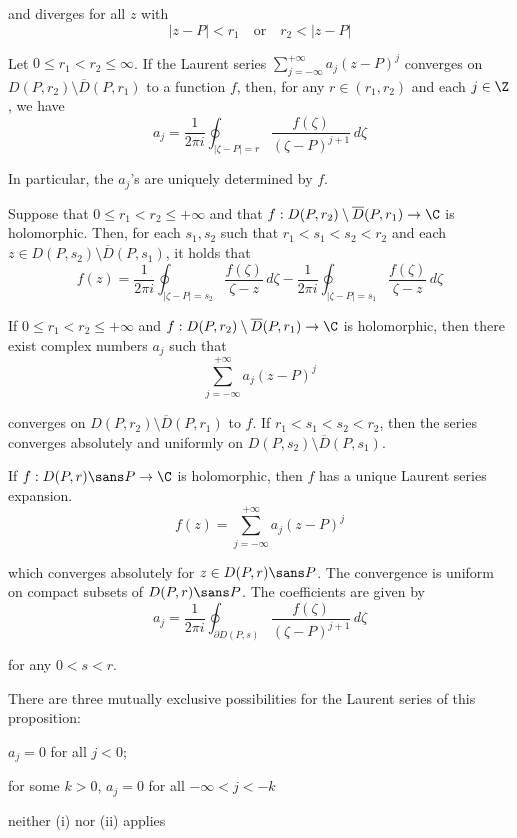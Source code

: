 and diverges for all $z$ with
$$
  |z-P|<r_1\quad\text{or}\quad r_2<|z-P|
$$

\label{eafd61e}

Let $0\leq r_1<r_2\leq\infty$. If the Laurent series
$\sum_{j=-\infty}^{+\infty}a_j(z-P)^j$ converges on $D(P,r_2)\setminus\overline
D(P,r_1)$ to a function $f$, then, for any $r\in(r_1,r_2)$ and each $j\in\Z$,
we have
$$
  a_j=\frac1{2\pi i}\oint_{|\zeta-P|=r}\frac{f(\zeta)}{(\zeta-P)^{j+1}}\,d\zeta
$$

In particular, the $a_j$'s are uniquely determined by $f$.

\label{ca5d89e}

Suppose that $0\leq r_1<r_2\leq+\infty$ and that $f:D(P,r_2)\setminus\overline
D(P,r_1)\to\C$ is holomorphic. Then, for each $s_1,s_2$ such that
$r_1<s_1<s_2<r_2$ and each $z\in D(P,s_2)\setminus\overline D(P,s_1)$, it holds
that
$$
  f(z)=\frac1{2\pi i}\oint_{|\zeta-P|=s_2}\frac{f(\zeta)}{\zeta-z}\,d\zeta
  -\frac1{2\pi i}\oint_{|\zeta-P|=s_1}\frac{f(\zeta)}{\zeta-z}\,d\zeta
$$


If $0\leq r_1<r_2\leq+\infty$ and $f:D(P,r_2)\setminus\overline D(P,r_1)\to\C$
is holomorphic, then there exist complex numbers $a_j$ such that
$$
  \sum_{j=-\infty}^{+\infty}a_j(z-P)^j
$$

converges on $D(P,r_2)\setminus\overline D(P,r_1)$ to $f$. If
$r_1<s_1<s_2<r_2$, then the series converges absolutely and uniformly on
$D(P,s_2)\setminus\overline D(P,s_1)$.


If $f:D(P,r)\sans P\to\C$ is holomorphic, then $f$ has a unique Laurent series
expansion.
$$
  f(z)=\sum_{j=-\infty}^{+\infty}a_j(z-P)^j
$$

which converges absolutely for $z\in D(P,r)\sans P$. The convergence is uniform
on compact subsets of $D(P,r)\sans P$. The coefficients are given by
$$
  a_j=\frac1{2\pi i}\oint_{\partial D(P,s)}\frac{f(\zeta)}{(\zeta-P)^{j+1}}\,d\zeta
$$

for any $0<s<r$.

There are three mutually exclusive possibilities for the Laurent series of this
proposition:
\begin{enumerati}
  \item $a_j=0$ for all $j<0$;
  \item for some $k>0$, $a_j=0$ for all $-\infty<j<-k$
  \item neither (i) nor (ii) applies
\end{enumerati}

